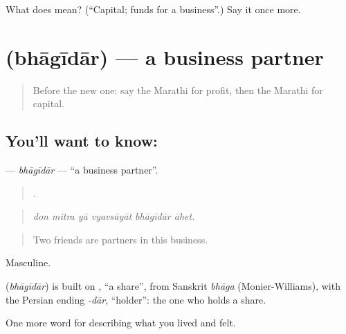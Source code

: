 \begin{tcolorbox}[breakable,colback=teal!4,colframe=teal!35!black,title={Before you move on}]
What does  mean? (\textquotedblleft{}Capital; funds for a business\textquotedblright{}.) Say it once more.
\end{tcolorbox}
\section[\texorpdfstring{\mr{भागीदार} (bhāgīdār)}{भागीदार (bhāgīdār)}]{ (bhāgīdār) — a business partner}

\label{lesson:MR-C511-bhagidar}



\begin{quote}
Before the new one: say the Marathi for profit, then the Marathi for capital.
\end{quote}

\subsection*{You'll want to know: }
\textbf{} — \emph{bhāgīdār} — \textquotedblleft{}a business partner\textquotedblright{}.

\begin{quote}
     .
\end{quote}

\begin{quote}
\emph{don mitra yā vyavsāyāt bhāgīdār āhet.}
\end{quote}

\begin{quote}
Two friends are partners in this business.
\end{quote}

Masculine.

\begin{cousinweb}
\textbf{} (\emph{bhāgīdār}) is built on , \textquotedblleft{}a share\textquotedblright{}, from Sanskrit \emph{bhāga} (Monier-Williams), with the Persian ending \emph{-dār}, \textquotedblleft{}holder\textquotedblright{}: the one who holds a share.
\end{cousinweb}

\begin{grammarlens}[title={What you've built}]
One more word for describing what you lived and felt.
\end{grammarlens}

